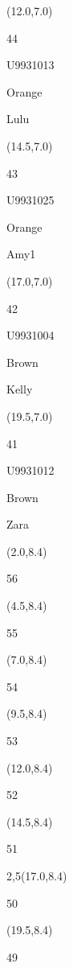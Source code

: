 \documentclass[a4paper]{article}
\newcommand{\myseat}[4]{%
\vspace{-0.1cm} \hspace{-0.5cm}
\parbox[t][2.2cm][t]{3.5cm}{%
\small #1 %
\begin{description}
\vspace{-0.1cm}
\item [ID:] #2
\vspace{-0.1cm}
\item [Team:] #3 \normalsize
\vspace{-0.1cm}
\item \normalsize #4
\vspace{-0.1cm}
\end{description}
}
}
\begin{document}
\begin{textblock}{2.5}(12.0,7.0)
\myseat{44}{U9931013}{Orange}{Lulu}
\end{textblock}

\begin{textblock}{2.5}(14.5,7.0)
\myseat{43}{U9931025}{Orange}{Amy1}
\end{textblock}

\begin{textblock}{2.5}(17.0,7.0)
\myseat{42}{U9931004}{Brown}{Kelly}
\end{textblock}

\begin{textblock}{2.5}(19.5,7.0)
\myseat{41}{U9931012}{Brown}{Zara}
\end{textblock}


\begin{textblock}{2.5}(2.0,8.4)
\textblockcolor{}
\myseat{56}{}{}{}
\end{textblock}

\begin{textblock}{2.5}(4.5,8.4)
\textblockcolor{}
\myseat{55}{}{}{}
\end{textblock}

\begin{textblock}{2.5}(7.0,8.4)
\textblockcolor{}
\myseat{54}{}{}{}
\end{textblock}

\begin{textblock}{2.5}(9.5,8.4)
\textblockcolor{}
\myseat{53}{}{}{}
\end{textblock}

\begin{textblock}{2.5}(12.0,8.4)
\textblockcolor{}
\myseat{52}{}{}{}
\end{textblock}

\begin{textblock}{2.5}(14.5,8.4)
\textblockcolor{}
\myseat{51}{}{}{}
\end{textblock}

\begin{textblock}{2,5}(17.0,8.4)
\textblockcolor{}
\myseat{50}{}{}{}
\end{textblock}

\begin{textblock}{2.5}(19.5,8.4)
\textblockcolor{}
\myseat{49}{}{}{}
\end{textblock}
\end{document}
